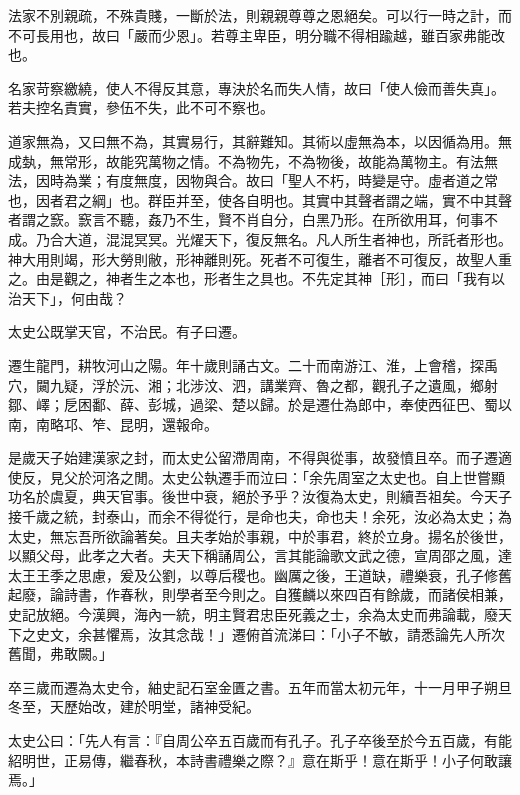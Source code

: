 \begin{pinyinscope}
法家不別親疏，不殊貴賤，一斷於法，則親親尊尊之恩絕矣。可以行一時之計，而不可長用也，故曰「嚴而少恩」。若尊主卑臣，明分職不得相踰越，雖百家弗能改也。

名家苛察繳繞，使人不得反其意，專決於名而失人情，故曰「使人儉而善失真」。若夫控名責實，參伍不失，此不可不察也。

道家無為，又曰無不為，其實易行，其辭難知。其術以虛無為本，以因循為用。無成埶，無常形，故能究萬物之情。不為物先，不為物後，故能為萬物主。有法無法，因時為業；有度無度，因物與合。故曰「聖人不朽，時變是守。虛者道之常也，因者君之綱」也。群臣并至，使各自明也。其實中其聲者謂之端，實不中其聲者謂之窾。窾言不聽，姦乃不生，賢不肖自分，白黑乃形。在所欲用耳，何事不成。乃合大道，混混冥冥。光燿天下，復反無名。凡人所生者神也，所託者形也。神大用則竭，形大勞則敝，形神離則死。死者不可復生，離者不可復反，故聖人重之。由是觀之，神者生之本也，形者生之具也。不先定其神［形］，而曰「我有以治天下」，何由哉？

太史公既掌天官，不治民。有子曰遷。

遷生龍門，耕牧河山之陽。年十歲則誦古文。二十而南游江、淮，上會稽，探禹穴，闚九疑，浮於沅、湘；北涉汶、泗，講業齊、魯之都，觀孔子之遺風，鄉射鄒、嶧；戹困鄱、薛、彭城，過梁、楚以歸。於是遷仕為郎中，奉使西征巴、蜀以南，南略邛、笮、昆明，還報命。

是歲天子始建漢家之封，而太史公留滯周南，不得與從事，故發憤且卒。而子遷適使反，見父於河洛之閒。太史公執遷手而泣曰：「余先周室之太史也。自上世嘗顯功名於虞夏，典天官事。後世中衰，絕於予乎？汝復為太史，則續吾祖矣。今天子接千歲之統，封泰山，而余不得從行，是命也夫，命也夫！余死，汝必為太史；為太史，無忘吾所欲論著矣。且夫孝始於事親，中於事君，終於立身。揚名於後世，以顯父母，此孝之大者。夫天下稱誦周公，言其能論歌文武之德，宣周邵之風，達太王王季之思慮，爰及公劉，以尊后稷也。幽厲之後，王道缺，禮樂衰，孔子修舊起廢，論詩書，作春秋，則學者至今則之。自獲麟以來四百有餘歲，而諸侯相兼，史記放絕。今漢興，海內一統，明主賢君忠臣死義之士，余為太史而弗論載，廢天下之史文，余甚懼焉，汝其念哉！」遷俯首流涕曰：「小子不敏，請悉論先人所次舊聞，弗敢闕。」

卒三歲而遷為太史令，紬史記石室金匱之書。五年而當太初元年，十一月甲子朔旦冬至，天歷始改，建於明堂，諸神受紀。

太史公曰：「先人有言：『自周公卒五百歲而有孔子。孔子卒後至於今五百歲，有能紹明世，正易傳，繼春秋，本詩書禮樂之際？』意在斯乎！意在斯乎！小子何敢讓焉。」


\end{pinyinscope}
